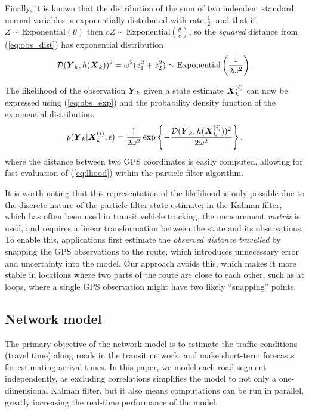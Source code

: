 Finally, it is known that the distribution of the sum of two indendent 
standard normal variables is exponentially distributed with rate $\frac{1}{2}$,
and that if $Z \sim \mathrm{Exponential}(\theta)$ then
$cZ \sim \mathrm{Exponential}(\frac{\theta}{c})$,
so the \emph{squared} distance from (\ref{eq:obs_dist}) has exponential distribution
\begin{equation}
\label{eq:obs_exp}
\mathcal{D}(\mbox{$\boldsymbol{Y}$}_k, h(\mbox{$\boldsymbol{X}$}_k))^2 =
\omega^2(z_1^2 + z_2^2) \sim \mathrm{Exponential}\left(\frac{1}{2\omega^2}\right).
\end{equation}

The likelihood of the observation $\mbox{$\boldsymbol{Y}$}_k$ given a state estimate $\mbox{$\boldsymbol{X}$}_k^{(i)}$
can now be expressed using (\ref{eq:obs_exp}) 
and the probability density function of the exponential distribution,
\begin{equation}
\label{eq:lhood}
p(\mbox{$\boldsymbol{Y}$}_k | \mbox{$\boldsymbol{X}$}_k^{(i)}, \epsilon) =
\frac{1}{2\omega^2}\exp\left\{
    -\frac{\mathcal{D}(\mbox{$\boldsymbol{Y}$}_k, h(\mbox{$\boldsymbol{X}$}_k^{(i)}))^2}{2\omega^2}
\right\},
\end{equation}
where the distance between two GPS coordinates is easily computed,
allowing for fast evaluation of (\ref{eq:lhood}) within the particle filter algorithm.


It is worth noting that this representation of the likelihood is only
possible due to the discrete nature of the particle filter state estimate;
in the Kalman filter, which has often been used in transit vehicle tracking,
the measurement \emph{matrix} is used, and requires a linear
transformation between the state and its observations.
To enable this, applications first estimate the \emph{observed distance travelled}
by snapping the GPS observations to the route,
which introduces unnecessary error and uncertainty into the model.
Our approach avoids this, which makes it more stable in locations where two 
parts of the route are close to each other,
such as at loops, where a single GPS observation might have two likely ``snapping'' points.


\subsection{Network model}
\label{sec:kf}

The primary objective of the network model is to estimate the \rt traffic conditions
(travel time) along roads in the transit network, 
and make short-term forecasts for estimating arrival times.
In this paper, we model each road segment independently,
as excluding correlations simplifies the model to not only a one-dimensional Kalman filter,
but it also means computations can be run in parallel,
greatly increasing the real-time performance of the model.


